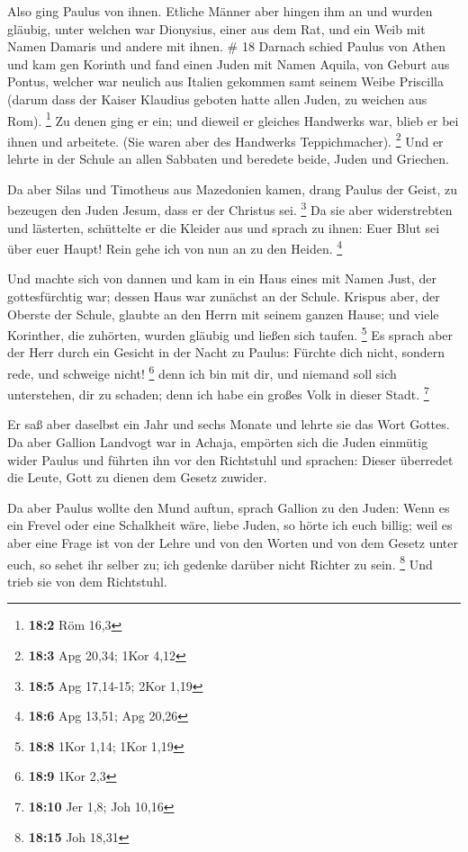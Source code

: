  Also ging Paulus von ihnen.  Etliche
Männer aber hingen ihm an und wurden gläubig, unter welchen war
Dionysius, einer aus dem Rat, und ein Weib mit Namen Damaris und andere
mit ihnen. \# 18  Darnach schied Paulus von Athen und kam
gen Korinth  und fand einen Juden mit Namen Aquila, von
Geburt aus Pontus, welcher war neulich aus Italien gekommen samt seinem
Weibe Priscilla (darum dass der Kaiser Klaudius geboten hatte allen
Juden, zu weichen aus Rom). \footnote{\textbf{18:2} Röm 16,3}
 Zu denen ging er ein; und dieweil er gleiches Handwerks
war, blieb er bei ihnen und arbeitete. (Sie waren aber des Handwerks
Teppichmacher). \footnote{\textbf{18:3} Apg 20,34; 1Kor 4,12}
 Und er lehrte in der Schule an allen Sabbaten und
beredete beide, Juden und Griechen.

 Da aber Silas und Timotheus aus Mazedonien kamen, drang
Paulus der Geist, zu bezeugen den Juden Jesum, dass er der Christus sei.
\footnote{\textbf{18:5} Apg 17,14-15; 2Kor 1,19}  Da sie
aber widerstrebten und lästerten, schüttelte er die Kleider aus und
sprach zu ihnen: Euer Blut sei über euer Haupt! Rein gehe ich von nun an
zu den Heiden. \footnote{\textbf{18:6} Apg 13,51; Apg 20,26}

 Und machte sich von dannen und kam in ein Haus eines mit
Namen Just, der gottesfürchtig war; dessen Haus war zunächst an der
Schule.  Krispus aber, der Oberste der Schule, glaubte an
den Herrn mit seinem ganzen Hause; und viele Korinther, die zuhörten,
wurden gläubig und ließen sich taufen. \footnote{\textbf{18:8} 1Kor
  1,14; 1Kor 1,19}  Es sprach aber der Herr durch ein
Gesicht in der Nacht zu Paulus: Fürchte dich nicht, sondern rede, und
schweige nicht! \footnote{\textbf{18:9} 1Kor 2,3}  denn
ich bin mit dir, und niemand soll sich unterstehen, dir zu schaden; denn
ich habe ein großes Volk in dieser Stadt. \footnote{\textbf{18:10} Jer
  1,8; Joh 10,16}

 Er saß aber daselbst ein Jahr und sechs Monate und
lehrte sie das Wort Gottes.  Da aber Gallion Landvogt war
in Achaja, empörten sich die Juden einmütig wider Paulus und führten ihn
vor den Richtstuhl  und sprachen: Dieser überredet die
Leute, Gott zu dienen dem Gesetz zuwider.

 Da aber Paulus wollte den Mund auftun, sprach Gallion zu
den Juden: Wenn es ein Frevel oder eine Schalkheit wäre, liebe Juden, so
hörte ich euch billig;  weil es aber eine Frage ist von
der Lehre und von den Worten und von dem Gesetz unter euch, so sehet ihr
selber zu; ich gedenke darüber nicht Richter zu sein. \footnote{\textbf{18:15}
  Joh 18,31}  Und trieb sie von dem Richtstuhl.

